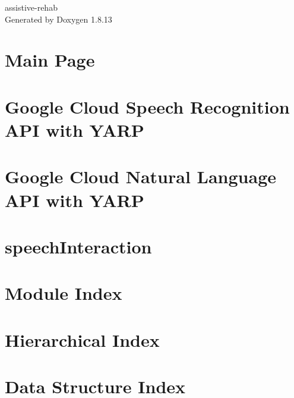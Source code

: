 \documentclass[twoside]{book}
\newcommand{\+}{\discretionary{\mbox{\scriptsize$\hookleftarrow$}}{}{}}
\newcommand{\clearemptydoublepage}{%
  \newpage{\pagestyle{empty}\cleardoublepage}%
}
\begin{document}
\begin{titlepage}
\vspace*{7cm}
\begin{center}%
{\Large assistive-\/rehab }\\
\vspace*{1cm}
{\large Generated by Doxygen 1.8.13}\\
\end{center}
\end{titlepage}
\clearemptydoublepage
{}
\tableofcontents
\clearemptydoublepage
{}

\chapter{Main Page}
\label{index}\hypertarget{index}{}
\chapter{Google Cloud Speech Recognition A\+PI with Y\+A\+RP}
\label{md__home_vvasco_dev_robotology_assistive-rehab_modules_speechInteraction_modules_googleSpeech_README}

\chapter{Google Cloud Natural Language A\+PI with Y\+A\+RP}
\label{md__home_vvasco_dev_robotology_assistive-rehab_modules_speechInteraction_modules_googleSpeechProcess_README}

\chapter{speech\+Interaction}
\label{md__home_vvasco_dev_robotology_assistive-rehab_modules_speechInteraction_README}

\chapter{Module Index}

\chapter{Hierarchical Index}

\chapter{Data Structure Index}

\end{document}
